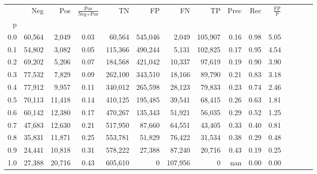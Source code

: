 \begin{tabular}{rrrcrrrrrrrrrrr}
\toprule
{} &     Neg &     Pos & $\frac{\text{Pos}}{\text{Neg}+\text{Pos}}$ &       TN &       FP &       FN &       TP &  Prec &   Rec & $\frac{\text{FP}}{\text{P}}$ \\
p   &         &         &                                            &          &          &          &          &       &       &                              \\
\midrule
0.0 &  60,564 &   2,049 &                                       0.03 &   60,564 &  545,046 &    2,049 &  105,907 &  0.16 &  0.98 &                         5.05 \\
0.1 &  54,802 &   3,082 &                                       0.05 &  115,366 &  490,244 &    5,131 &  102,825 &  0.17 &  0.95 &                         4.54 \\
0.2 &  69,202 &   5,206 &                                       0.07 &  184,568 &  421,042 &   10,337 &   97,619 &  0.19 &  0.90 &                         3.90 \\
0.3 &  77,532 &   7,829 &                                       0.09 &  262,100 &  343,510 &   18,166 &   89,790 &  0.21 &  0.83 &                         3.18 \\
0.4 &  77,912 &   9,957 &                                       0.11 &  340,012 &  265,598 &   28,123 &   79,833 &  0.23 &  0.74 &                         2.46 \\
0.5 &  70,113 &  11,418 &                                       0.14 &  410,125 &  195,485 &   39,541 &   68,415 &  0.26 &  0.63 &                         1.81 \\
0.6 &  60,142 &  12,380 &                                       0.17 &  470,267 &  135,343 &   51,921 &   56,035 &  0.29 &  0.52 &                         1.25 \\
0.7 &  47,683 &  12,630 &                                       0.21 &  517,950 &   87,660 &   64,551 &   43,405 &  0.33 &  0.40 &                         0.81 \\
0.8 &  35,831 &  11,871 &                                       0.25 &  553,781 &   51,829 &   76,422 &   31,534 &  0.38 &  0.29 &                         0.48 \\
0.9 &  24,441 &  10,818 &                                       0.31 &  578,222 &   27,388 &   87,240 &   20,716 &  0.43 &  0.19 &                         0.25 \\
1.0 &  27,388 &  20,716 &                                       0.43 &  605,610 &        0 &  107,956 &        0 &   nan &  0.00 &                         0.00 \\
\bottomrule
\end{tabular}
